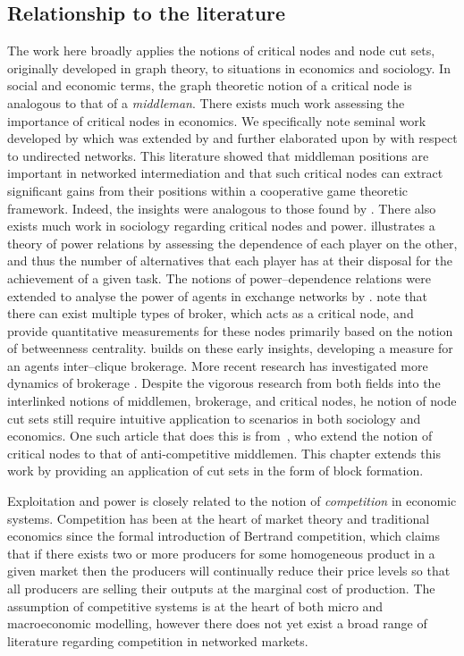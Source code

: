 \subsection{Relationship to the literature}

The work here broadly applies the notions of critical nodes and node cut sets, originally developed in graph theory, to situations in economics and sociology. In social and economic terms, the graph theoretic notion of a critical node is analogous to that of a \emph{middleman}. There exists much work assessing the importance of critical nodes in economics. We specifically note seminal work developed by \citet{KalaiMiddlemen1978} which was extended by \citet{JacksonWolinsky1996} and further elaborated upon by \citet{GillesChakrabarti2006} with respect to undirected networks. This literature showed that middleman positions are important in networked intermediation and that such critical nodes can extract significant gains from their positions within a cooperative game theoretic framework. Indeed, the insights were analogous to those found by \citet{RubinsteinWolinsky1987}. There also exists much work in sociology regarding critical nodes and power. \citet{Emerson1962} illustrates a theory of power relations by assessing the dependence of each player on the other, and thus the number of alternatives that each player has at their disposal for the achievement of a given task. The notions of power--dependence relations were extended to analyse the power of agents in exchange networks by \citet{CookEmersonGillmoreYamagishi1983}. \citet{GouldFernandez1989} note that there can exist multiple types of broker, which acts as a critical node, and provide quantitative measurements for these nodes primarily based on the notion of betweenness centrality. \citet{Gould1989} builds on these early insights, developing a measure for an agents inter--clique brokerage. More recent research has investigated more dynamics of brokerage \citep{Spiro2013}. Despite the vigorous research from both fields into the interlinked notions of middlemen, brokerage, and critical nodes, he notion of node cut sets still require intuitive application to scenarios in both sociology and economics. One such article that does this is from~\citet{SimsGilles2014}, who extend the notion of critical nodes to that of anti-competitive middlemen. This chapter extends this work by providing an application of cut sets in the form of block formation.

Exploitation and power is closely related to the notion of \emph{competition} in economic systems. Competition has been at the heart of market theory and traditional economics since the formal introduction of Bertrand competition, which claims that if there exists two or more producers for some homogeneous product in a given market then the producers will continually reduce their price levels so that all producers are selling their outputs at the marginal cost of production. The assumption of competitive systems is at the heart of both micro and macroeconomic modelling, however there does not yet exist a broad range of literature regarding competition in networked markets.

